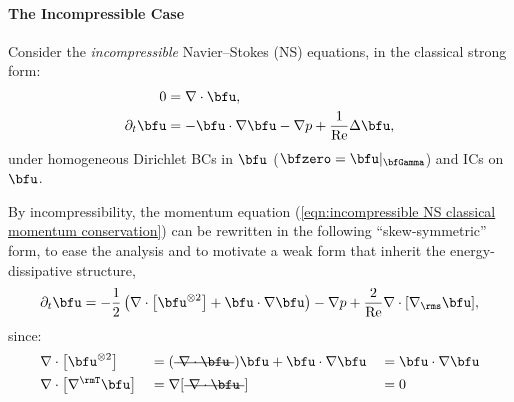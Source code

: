 \paragraph*{The Incompressible Case}
    Consider the \emph{incompressible} Navier--Stokes (NS) equations, in the classical strong form:
    \begin{align}
                       0  &=  \nabla\cdot\bfu,  \label{eqn:incompressible NS mass conservation}  \\
        \partial_{t}\bfu  &=  - \bfu\cdot\nabla\bfu - \nabla p + \frac{1}{\rmRe}\Delta\bfu,  \label{eqn:incompressible NS classical momentum conservation}
    \end{align}
    under homogeneous Dirichlet BCs in $\bfu$ ($\bfzero  =  \bfu|_{\bfGamma}$) and ICs on $\bfu$.

    By incompressibility, the momentum equation (\ref{eqn:incompressible NS classical momentum conservation}) can be rewritten in the following ``skew-symmetric'' form, to ease the analysis and to motivate a weak form that inherit the energy-dissipative structure,
    \begin{equation}\label{eqn:incompressible NS skew-symmetric momentum equation}
        \partial_{t}\bfu  =  - \frac{1}{2}\left(\nabla\cdot\left[\bfu^{\otimes 2}\right] + \bfu\cdot\nabla\bfu\right) - \nabla p + \frac{2}{\rmRe}\nabla\cdot[\nabla_{\rms}\bfu],
    \end{equation}
    since:
    \begin{align}
        &\nabla\cdot\left[\bfu^{\otimes 2}\right]  &&=  (\mst{\nabla\cdot\bfu})\bfu + \bfu\cdot\nabla\bfu  &&=  \bfu\cdot\nabla\bfu  \\
        &\nabla\cdot\left[\nabla^{\rmT}\bfu\right]  &&=  \nabla[\mst{\nabla\cdot\bfu}]  &&=  0
    \end{align}

    \begin{remark}
    \end{remark}
    
